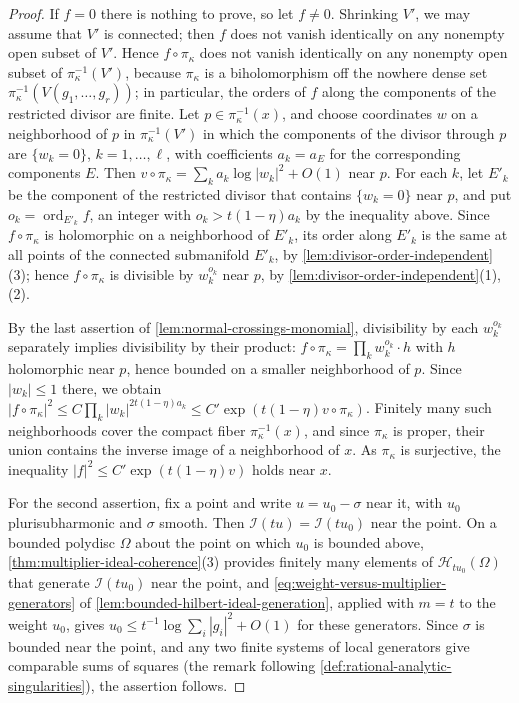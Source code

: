 \begin{proof}
If $f=0$ there is nothing to prove, so let $f\neq0$. Shrinking $V'$, we may assume that $V'$ is connected; then $f$ does not vanish identically on any nonempty open subset of $V'$. Hence $f\circ\pi_\kappa$ does not vanish identically on any nonempty open subset of $\pi_\kappa^{-1}(V')$, because $\pi_\kappa$ is a biholomorphism off the nowhere dense set $\pi_\kappa^{-1}(V(g_1,\ldots,g_r))$; in particular, the orders of $f$ along the components of the restricted divisor are finite. Let $p\in\pi_\kappa^{-1}(x)$, and choose coordinates $w$ on a neighborhood of $p$ in $\pi_\kappa^{-1}(V')$ in which the components of the divisor through $p$ are $\{w_k=0\}$, $k=1,\ldots,\ell$, with coefficients $a_k=a_E$ for the corresponding components $E$. Then $v\circ\pi_\kappa=\sum_ka_k\log|w_k|^2+O(1)$ near $p$. For each $k$, let $E'_k$ be the component of the restricted divisor that contains $\{w_k=0\}$ near $p$, and put $o_k=\operatorname{ord}_{E'_k}f$, an integer with $o_k>t(1-\eta)a_k$ by the inequality above. Since $f\circ\pi_\kappa$ is holomorphic on a neighborhood of $E'_k$, its order along $E'_k$ is the same at all points of the connected submanifold $E'_k$, by \cref{lem:divisor-order-independent}(3); hence $f\circ\pi_\kappa$ is divisible by $w_k^{o_k}$ near $p$, by \cref{lem:divisor-order-independent}(1),(2).

By the last assertion of \cref{lem:normal-crossings-monomial}, divisibility by each $w_k^{o_k}$ separately implies divisibility by their product: $f\circ\pi_\kappa=\prod_kw_k^{o_k}\cdot h$ with $h$ holomorphic near $p$, hence bounded on a smaller neighborhood of $p$. Since $|w_k|\leq1$ there, we obtain $|f\circ\pi_\kappa|^2\leq C\prod_k|w_k|^{2t(1-\eta)a_k}\leq C'\exp(t(1-\eta)v\circ\pi_\kappa)$. Finitely many such neighborhoods cover the compact fiber $\pi_\kappa^{-1}(x)$, and since $\pi_\kappa$ is proper, their union contains the inverse image of a neighborhood of $x$. As $\pi_\kappa$ is surjective, the inequality $|f|^2\leq C'\exp(t(1-\eta)v)$ holds near $x$.

For the second assertion, fix a point and write $u=u_0-\sigma$ near it, with $u_0$ plurisubharmonic and $\sigma$ smooth. Then $\mathcal I(tu)=\mathcal I(tu_0)$ near the point. On a bounded polydisc $\Omega$ about the point on which $u_0$ is bounded above, \cref{thm:multiplier-ideal-coherence}(3) provides finitely many elements of $\mathcal H_{tu_0}(\Omega)$ that generate $\mathcal I(tu_0)$ near the point, and \eqref{eq:weight-versus-multiplier-generators} of \cref{lem:bounded-hilbert-ideal-generation}, applied with $m=t$ to the weight $u_0$, gives $u_0\leq t^{-1}\log\sum_i|g_i|^2+O(1)$ for these generators. Since $\sigma$ is bounded near the point, and any two finite systems of local generators give comparable sums of squares (the remark following \cref{def:rational-analytic-singularities}), the assertion follows.
\end{proof}

